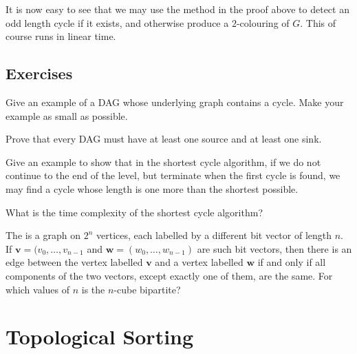 It is now easy to see that we may use the method in the proof above
to detect an odd length cycle if it exists, and otherwise produce a
$2$-colouring of $G$. This of course runs in linear time.


\subsection*{Exercises}


\begin{Exercise}
\label{ex:DAG-vs-tree}
Give an example of a DAG whose underlying graph contains a cycle. Make
your example as small as possible.

\end{Exercise}

\begin{Exercise}
\label{ex:DAG-sink}
Prove that every DAG must have at least one source and at least one sink.
\end{Exercise}


\begin{Exercise}
\label{ex:shortest-cycle-thm}

Give an example to show that in the shortest cycle algorithm, if we
do not continue to the end of the level, but terminate when the first
cycle is found, we may find a cycle whose length is one more than the
shortest possible.

\end{Exercise}

\begin{Exercise}
\label{ex:shortest-cycle-runtime}

What is the time complexity of the shortest cycle algorithm?

\end{Exercise}

\begin{Exercise}
\label{ex:do2col}

The  is a graph on $2^n$ vertices, each labelled by
a different bit vector of length $n$. If $\mathbf{v} = (v_0, \dots ,
v_{n-1}$ and $\mathbf{w} = (w_0, \dots , w_{n-1})$ are such bit vectors,
then there is an edge between the vertex labelled $\mathbf{v}$ and a
vertex labelled $\mathbf{w}$ if and only if all components of the two
vectors, except exactly one of them, are the same.  For which values of
$n$ is the $n$-cube bipartite?
\end{Exercise}

\section{Topological Sorting}
\label{sec:topsort}

